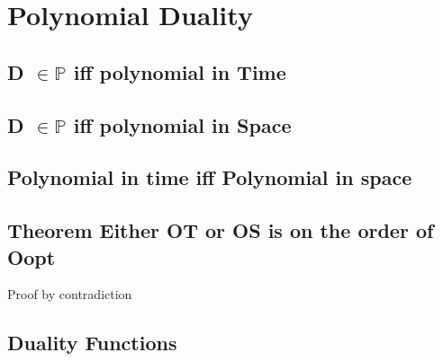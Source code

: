 \documentclass[11pt]{article}
\begin{document}
\newpage
\section{Polynomial Duality}
\subsection{D $\in \mathbb{P}$ iff polynomial in Time}
\subsection{D $\in \mathbb{P}$ iff polynomial in Space}
\subsection{Polynomial in time iff Polynomial in space}
\subsection{Theorem Either OT or OS is on the order of Oopt}
Proof by contradiction





\subsection{Duality Functions}
\end{document}

